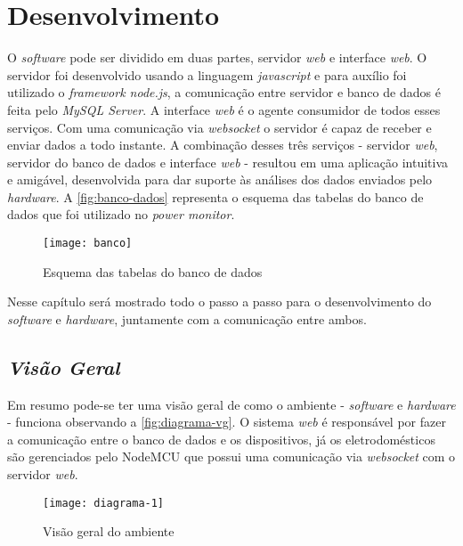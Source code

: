 \chapter[Desenvolvimento]{Desenvolvimento}
\label{ch:desenvolvimento}

O \textit{software} pode ser dividido em duas partes, servidor \textit{web} e interface \textit{web}. O servidor foi desenvolvido usando a linguagem
\textit{javascript} e para auxílio foi utilizado o \textit{framework node.js}, a comunicação entre servidor e banco de dados
é feita pelo \textit{MySQL Server}. A interface \textit{web} é o agente consumidor de todos esses serviços. Com uma comunicação via 
\textit{websocket} o servidor é capaz de receber e enviar dados a todo instante. A combinação desses três serviços - servidor \textit{web},
servidor do banco de dados e interface \textit{web} - resultou em uma aplicação intuitiva e amigável, desenvolvida para dar suporte às análises dos dados
enviados pelo \textit{hardware}. A \autoref{fig:banco-dados} representa o esquema das tabelas do banco de dados que foi utilizado no \textit{power monitor}. 


\begin{figure}[h!]
	\texttt{[image: banco]}
	\centering
	\caption[Esquema das tabelas do banco de dados]{Esquema das tabelas do banco de dados}
	\label{fig:banco-dados}
\end{figure}
\FloatBarrier

Nesse capítulo será mostrado todo o passo a passo para o desenvolvimento do \textit{software} e \textit{hardware}, juntamente com a comunicação 
entre ambos.

\section[\textit{Visão Geral}]{\textit{Visão Geral}}\label{visal-geral}

Em resumo pode-se ter uma visão geral de como o ambiente - \textit{software} e \textit{hardware} - funciona observando a \autoref{fig:diagrama-vg}.
O sistema \textit{web} é responsável por fazer a comunicação entre o banco de dados e os dispositivos, já os eletrodomésticos são gerenciados
pelo NodeMCU que possui uma comunicação via \textit{websocket} com o servidor \textit{web}.

\begin{figure}[h!]
	\texttt{[image: diagrama-1]}
	\centering
	\caption[Visão geral do ambiente]{Visão geral do ambiente}
	\label{fig:diagrama-vg}
\end{figure}
\FloatBarrier

